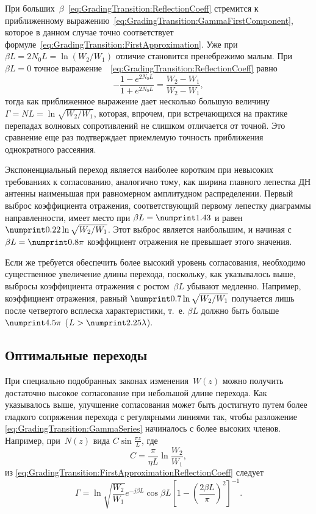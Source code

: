При больших~$\beta$~\eqref{eq:GradingTransition:ReflectionCoeff} стремится
к приближенному выражению~\eqref{eq:GradingTransition:GammaFirstComponent}, которое
в данном случае точно соответствует формуле~\eqref{eq:GradingTransition:FirstApproximation}. Уже при
$\beta L=2 N_0 L=\ln (W_2/W_1)$ отличие становится пренебрежимо малым.
При $\beta L=0$ точное выражение~~\eqref{eq:GradingTransition:ReflectionCoeff} равно
\begin{equation*}
    -\frac{1-e^{2 N_0 L}}{1+e^{2 N_0 L}} =
     \frac{W_2-W_1}{W_2-W_1},
\end{equation*}
тогда как приближенное выражение дает несколько большую величину
$\Gamma = NL = \ln\sqrt{W_2/W_1}$, которая, впрочем, при встречающихся
на практике перепадах волновых сопротивлений не слишком отличается от точной.
Это сравнение еще раз подтверждает приемлемую точность приближения однократного
рассеяния.

Экспоненциальный переход является наиболее коротким при невысоких требованиях
к согласованию, аналогично тому, как ширина главного лепестка ДН антенны
наименьшая при равномерном амплитудном распределении. Первый выброс коэффициента
отражения, соответствующий первому лепестку диаграммы направленности, имеет
место при $\beta L=\val{1.43}$ и равен $\val{0.22}\ln\sqrt{W_2/W_1}$. Этот
выброс является наибольшим, и начиная с $\beta L=\val{0.8}\pi$ коэффициент
отражения не превышает этого значения.

Если же требуется обеспечить более высокий уровень согласования, необходимо
существенное увеличение длины перехода, поскольку, как указывалось выше, выбросы
коэффициента отражения с ростом~$\beta L$ убывают медленно. Например,
коэффициент отражения, равный $\val{0.7}\ln\sqrt{W_2/W_1}$ получается лишь после
четвертого всплеска характеристики, т.~е. $\beta L$ должно быть больше
$\val{4.5}\pi$ ($L>\val{2.25}\lambda$).


\subsection{Оптимальные переходы}

При специально подобранных законах изменения~$W(z)$ можно получить достаточно
высокое согласование при небольшой длине перехода. Как указывалось выше,
улучшение согласования может быть достигнуто путем более гладкого сопряжения
перехода с регулярными линиями так, чтобы разложение \eqref{eq:GradingTransition:GammaSeries} начиналось с более
высоких членов. Например, при~$N(z)$ вида $C\sin\frac{\pi z}{L}$, где
\begin{equation*}
    C = \frac{\pi}{\eta L} \ln \frac{W_2}{W_1},
\end{equation*}
из \eqref{eq:GradingTransition:FirstApproximationReflectionCoeff} следует
\begin{equation*}
    \Gamma = \ln \sqrt{\frac{W_2}{W_1}} e^{-j\beta L} \cos{\beta L}
    \left[
        1 - \left( \frac{2\beta L}{\pi} \right) ^2
    \right]^{-1}.
\end{equation*}

